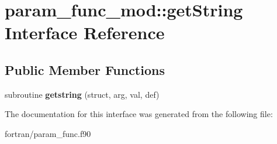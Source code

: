 \hypertarget{interfaceparam__func__mod_1_1get_string}{}\section{param\+\_\+func\+\_\+mod\+:\+:get\+String Interface Reference}
\label{interfaceparam__func__mod_1_1get_string}
\subsection*{Public Member Functions}
\begin{DoxyCompactItemize}
\item 
\mbox{\label{interfaceparam__func__mod_1_1get_string_ad4460c73f26b48f15427cf887345b822}} 
subroutine {\bfseries getstring} (struct, arg, val, def)
\end{DoxyCompactItemize}


The documentation for this interface was generated from the following file\+:\begin{DoxyCompactItemize}
\item 
fortran/param\+\_\+func.\+f90\end{DoxyCompactItemize}
